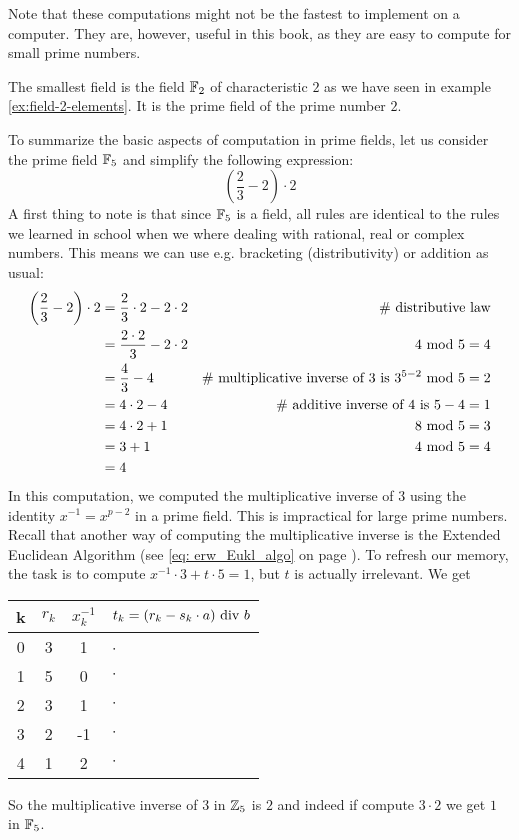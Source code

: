 Note that these computations might not be the fastest to implement on a computer. They are, however, useful in this book, as they are easy to compute for small prime numbers.
\begin{example}
The smallest field is the field $\mathbb{F}_2$ of characteristic $2$ as we have seen in example \ref{ex:field-2-elements}. It is the prime field of the prime number $2$.
\end{example}
\begin{example}\label{prime-field-F5}
To summarize the basic aspects of computation in prime fields, let us consider the prime field $\mathbb{F}_5$ and simplify the following expression:
$$\left(\frac{2}{3} - 2\right)\cdot 2 $$
A first thing to note is that since $\mathbb{F}_5$ is a field, all rules are identical to the rules we learned in school when we where dealing with rational, real or complex numbers. This means we can use e.g.  bracketing (distributivity) or addition as usual:
\begin{align*}
\left(\frac{2}{3} - 2\right)\cdot 2 &=
 \frac{2}{3}\cdot 2 - 2\cdot 2 & \text{\# distributive law}\\
 &= \frac{2\cdot 2}{3} - 2\cdot 2 & 4 \text{ mod } 5=4 \\
 &= \frac{4}{3} - 4 & \text{\# multiplicative inverse of 3 is } 3^{5-2} \text{ mod } 5=2\\
 &= 4\cdot 2 - 4 & \text{\# additive inverse of 4 is } 5-4=1\\
 &= 4\cdot 2 +1 & 8 \text{ mod } 5=3\\
 &= 3 +1 & 4 \text{ mod } 5=4\\
 &= 4
\end{align*}
In this computation, we computed the multiplicative inverse of $3$ using the identity
$x^{-1}=x^{p-2}$ in a prime field. This is impractical for large prime numbers. Recall that another way of computing the multiplicative inverse is the Extended Euclidean Algorithm (see \ref{eq: erw_Eukl_algo} on page \pageref{eq: erw_Eukl_algo}).  To refresh our memory, the task is to compute $x^{-1}\cdot 3 + t \cdot 5 =1$, but $t$ is actually irrelevant. We get
\begin{center}
  \begin{tabular}{c | c c l}
    k & $ r_k $ & $ x^{-1}_k $ & $ t_k = (r_k-s_k \cdot a) \text{ div } b $ \\\hline
    0 & 3 & 1 & $\cdot$\ \\
    1 & 5 & 0 & $\cdot$ \\
    2 & 3 & 1 & $\cdot$ \\
    3 & 2 &-1 & $\cdot$ \\
    4 & 1 & 2  & $\cdot$ \\
  \end{tabular}
\end{center}
So the multiplicative inverse of $3$ in $\mathbb{Z}_5$ is $2$ and indeed if compute $3\cdot 2$ we get $1$ in $\mathbb{F}_5$.
\end{example}
